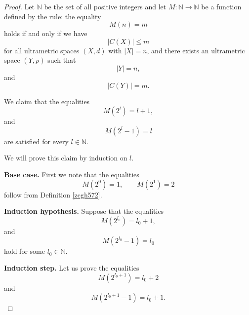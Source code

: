 \documentclass[pdflatex,sn-mathphys-num]{sn-jnl}%
\theoremstyle{thmstyleone}%
\theoremstyle{thmstyletwo}%
\theoremstyle{thmstylethree}%
\theoremstyle{thmstyletwo}%
\theoremstyle{thmstylethree}%
\begin{document}
\begin{proof}
Let $\mathbb{N}$ be the set of all positive integers and let
$M:\mathbb{N}\to\mathbb{N}$ be a function defined by the rule: the equality
\begin{equation}
M(n)=m
\label{abrt}
\end{equation}
holds   if and only if we have
\begin{equation}
|C(X)|\le m
\label{qvle}
\end{equation}
 for all ultrametric spaces $(X,d)$ with $|X|=n$, and there exists
an ultrametric space $(Y,\rho)$ such that
\begin{equation}
|Y|=n,
\label{tmka}
\end{equation}
and
\begin{equation}
|C(Y)|=m.
\label{plre}
\end{equation}

We claim that the equalities
\begin{equation}
M(2^l)=l+1,
\label{hzda}
\end{equation}
and
\begin{equation}
    \label{hzda-1}
    M(2^l-1)=l
\end{equation}
are satisfied for every  $l\in \mathbb N$.

We will prove this claim by induction on $l$.

\textbf{Base case.} First we note that the equalities
\[
M(2^0)=1, \qquad M(2^1)=2
\]
follow from Definition \ref{zcgh572}.



\textbf{Induction hypothesis.} Suppose that the equalities
\begin{equation}
M(2^{l_0})=l_0+1,
\label{wkps}
\end{equation}
and 
\begin{equation}
    \label{wkps-1}
    M(2^{l_0}-1)=l_0
\end{equation}
hold for some $l_0\in \mathbb N$.

\textbf{Induction step.} Let us prove the equalities
\begin{equation}
M(2^{l_0+1})=l_0+2
\label{nqte}
\end{equation}
and
\begin{equation}
    \label{4a}
    M(2^{l_0+1}-1)=l_0+1.
\end{equation}






\end{proof}
\end{document}
